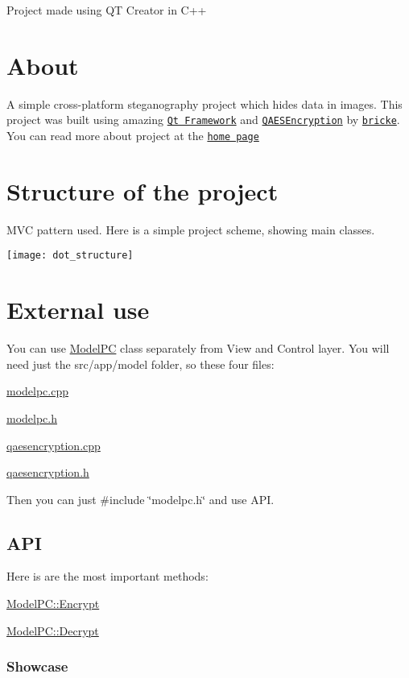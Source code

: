 Project made using QT Creator in C++\hypertarget{index_about}{}\section{About}\label{index_about}
A simple cross-\/platform steganography project which hides data in images. This project was built using amazing \href{https://qt.io}{\tt Qt Framework} and \href{https://github.com/bricke/Qt-AES}{\tt Q\+A\+E\+S\+Encryption} by \href{https://github.com/bricke}{\tt bricke}. You can read more about project at the \href{waleko.github.io/PictureCrypt}{\tt home page}\hypertarget{index_structure}{}\section{Structure of the project}\label{index_structure}
M\+VC pattern used. Here is a simple project scheme, showing main classes. 
\begin{DoxyImageNoCaption}
  \mbox{\texttt{[image: dot\_structure]}}
\end{DoxyImageNoCaption}
\hypertarget{index_ext-use}{}\section{External use}\label{index_ext-use}
You can use \hyperlink{class_model_p_c}{Model\+PC} class separately from View and Control layer. You will need just the src/app/model folder, so these four files\+:


\begin{DoxyItemize}
\item \hyperlink{modelpc_8cpp}{modelpc.\+cpp} 
\item \hyperlink{modelpc_8h}{modelpc.\+h} 
\item \hyperlink{qaesencryption_8cpp}{qaesencryption.\+cpp} 
\item \hyperlink{qaesencryption_8h}{qaesencryption.\+h} 
\end{DoxyItemize}

Then you can just {\ttfamily \#include \char`\"{}modelpc.\+h\char`\"{}} and use A\+PI.\hypertarget{index_use_api}{}\subsection{A\+PI}\label{index_use_api}
Here is are the most important methods\+: 
\begin{DoxyItemize}
\item \hyperlink{class_model_p_c_aad427b77cf44b5dadc5523ea03272c85}{Model\+P\+C\+::\+Encrypt} 
\item \hyperlink{class_model_p_c_afbca3c9c9b7d92f3a5cc81510ef06cc3}{Model\+P\+C\+::\+Decrypt} 
\end{DoxyItemize}\hypertarget{index_Showcase}{}\subsubsection{Showcase}\label{index_Showcase}

